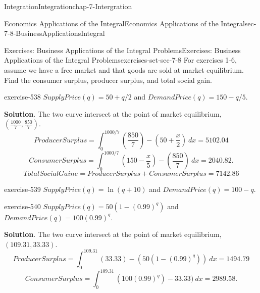 \documentclass[oneside,10pt,]{book}
\numberwithin{equation}{section}
\begin{document}
\begin{chapterptx}{Integration}{}{Integration}{}{}{chap-7-Intergration}
\begin{sectionptx}{Economics Applications of the Integral}{}{Economics Applications of the Integral}{}{}{sec-7-8-BusinessApplicationsIntegral}
\typeout{************************************************}
%
\begin{exercises-subsection-numberless}{Exercises: Business Applications of the Integral Problems}{}{Exercises: Business Applications of the Integral Problems}{}{}{exercises-set-sec-7-8}
\hypertarget{p-3125}{}%
For exercises 1-6, assume we have a free market and that goods are sold at market equilibrium.  Find the consumer surplus, producer surplus, and total social gain.%
\begin{divisionexercise}{1}{}{}{exercise-538}%
\hypertarget{p-3126}{}%
\(SupplyPrice(q)= 50+q/2\) and \(DemandPrice(q)= 150-q/5\).%
\par\smallskip%
\noindent\textbf{Solution}.\hypertarget{solution-272}{}\quad%
\hypertarget{p-3127}{}%
The two curve intersect at the point of market equilibrium, \(\left({\frac{1000}{7},\frac{850}{7}}\right)\).%
%
\begin{equation*}
ProducerSurplus=
\int_0^{1000/7}
\left({\frac{850}{7}}\right)-
\left({50+\frac{x}{2}}\right)\ dx=5102.04
\end{equation*}
%
\begin{equation*}
ConsumerSurplus=
\int_0^{1000/7}
\left({150-\frac{x}{5}}\right)-\left({\frac{850}{7}}\right)\ dx=2040.82.
\end{equation*}
%
\begin{equation*}
TotalSocialGaine=ProducerSurplus+ConsumerSurplus=7142.86
\end{equation*}
\end{divisionexercise}%
\begin{divisionexercise}{2}{}{}{exercise-539}%
\hypertarget{p-3128}{}%
\(SupplyPrice(q)=\ln (q+10)\) and \(DemandPrice(q)= 100-q\).%
\end{divisionexercise}%
\begin{divisionexercise}{3}{}{}{exercise-540}%
\hypertarget{p-3129}{}%
\(SupplyPrice(q)= 50(1-(0.99)^q)\) and \(DemandPrice(q)= 100(0.99)^q\).%
\par\smallskip%
\noindent\textbf{Solution}.\hypertarget{solution-273}{}\quad%
\hypertarget{p-3130}{}%
The two curve intersect at the point of market equilibrium, \((109.31, 33.33)\).%
%
\begin{equation*}
ProducerSurplus=
\int_0^{109.31}
(33.33)-
\left({50(1-(0.99)^q)}\right)\ dx=1494.79
\end{equation*}
%
\begin{equation*}
ConsumerSurplus=
\int_0^{109.31}
\left({100(0.99)^q}\right)-33.33)\ dx=2989.58.
\end{equation*}

\end{divisionexercise}
\end{exercises-subsection-numberless}
\end{sectionptx}
\end{chapterptx}
\end{document}
